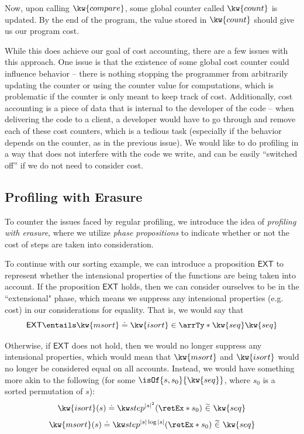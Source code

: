 \documentclass[letterpaper]{article}
\newcommand{\EXT}{\textsf{EXT}}
\begin{document}
Now, upon calling $\kw{compare}$, some global counter called $\kw{count}$ is updated. By the end of the program, the value stored in $\kw{count}$ should give us our program cost. 

While this does achieve our goal of cost accounting, there are a few issues with this approach. One issue is that the existence of some global cost counter could influence behavior -- there is nothing stopping the programmer
from arbitrarily updating the counter or using the counter value for computations, which is problematic if the counter is only meant to keep track of cost.
Additionally, cost accounting is a piece of data that is internal to the developer of the code -- when delivering the code to a client, a developer would have to go through and remove each of these cost counters, which is a tedious task (especially if the behavior depends on the counter, as in the previous issue). 
We would like to do profiling in a way that does not interfere with the code we write, and can be easily ``switched off'' if we do not need to consider cost.

\subsection{Profiling with Erasure}

To counter the issues faced by regular profiling, we introduce the idea of \textit{profiling with erasure}, where we utilize
\textit{phase propositions} to indicate whether or not the cost of steps are taken into consideration.

To continue with our sorting example, we can introduce a proposition $\EXT$ to represent whether the intensional properties of the functions are being taken into account.
If the proposition $\EXT$ holds, then we can consider ourselves to be in the ``extensional" phase, which means we suppress any intensional properties (e.g. cost) in our considerations for equality. That is,
we would say that \[\EXT \entails \exEqOf{\kw{msort}}{\kw{isort}}{\arrTy*{\kw{seq}}{\kw{seq}}}\]

Otherwise, if $\EXT$ does not hold, then we would no longer suppress any intensional properties, which would mean that $\kw{msort}$ and $\kw{isort}$ would no longer be considered equal on all accounts. 
Instead, we would have something more akin to the following (for some $\isOf{s, s_0}{\kw{seq}}$, where $s_0$ is a sorted permutation of $s$):
\[\compEqOf{\kw{isort}(s)}{\stepEx{|s|^2}{\retEx*{s_0}}}{\kw{seq}}\]
\[\compEqOf{\kw{msort}(s)}{\stepEx{|s|\log |s|}{\retEx*{s_0}}}{\kw{seq}}\]
\end{document}
